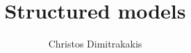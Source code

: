 \documentclass{beamer}
\title{Structured models}
\author[C. Dimitrakakis]{Christos Dimitrakakis}
\begin{document}
\begin{frame}
  \titlepage
\end{frame}



\end{document}
